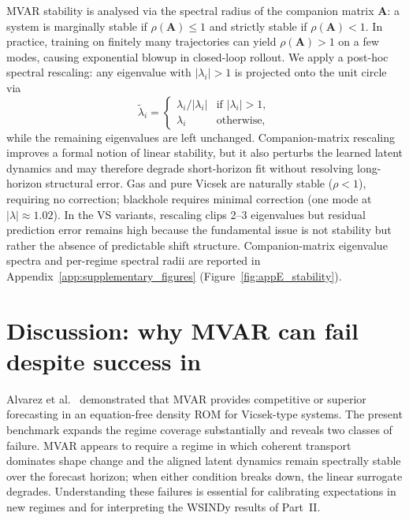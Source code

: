 MVAR stability is analysed via the spectral radius of the companion matrix
$\mathbf{A}$: a system is marginally stable if
$\rho(\mathbf{A})\le 1$ and strictly stable if $\rho(\mathbf{A})<1$.
In practice, training on finitely many trajectories can yield
$\rho(\mathbf{A})>1$ on a few modes, causing exponential blowup in
closed-loop rollout.  We apply a post-hoc spectral rescaling: any eigenvalue with
$|\lambda_i|>1$ is projected onto the unit circle via
\begin{equation}
  \tilde\lambda_i
  = \begin{cases}
      \lambda_i/|\lambda_i| & \text{if } |\lambda_i|>1, \\
      \lambda_i             & \text{otherwise,}
    \end{cases}
  \label{eq:eigenvalue_projection}
\end{equation}
while the remaining eigenvalues are left unchanged.  Companion-matrix
rescaling improves a formal notion of linear stability, but it also
perturbs the learned latent dynamics and may therefore degrade short-horizon
fit without resolving long-horizon structural error.  Gas and pure Vicsek are naturally stable ($\rho<1$),
requiring no correction; blackhole requires minimal correction (one mode
at $|\lambda|\approx 1.02$).  In the VS variants, rescaling clips 2--3
eigenvalues but residual prediction error remains high because the
fundamental issue is not stability but rather the absence of predictable
shift structure.  Companion-matrix eigenvalue spectra and per-regime
spectral radii are reported in
Appendix~\ref{app:supplementary_figures}
(Figure~\ref{fig:appE_stability}).

\section{Discussion: why MVAR can fail despite success in \cite{alvarez2025eqfree}}
\label{sec:ch7_mvar_failure}

Alvarez et al.~\cite{alvarez2025eqfree} demonstrated that MVAR provides
competitive or superior forecasting in an equation-free density ROM for
Vicsek-type systems.  The present benchmark expands the regime coverage
substantially and reveals two classes of failure.  MVAR appears to require a
regime in which coherent transport dominates shape change and the aligned
latent dynamics remain spectrally stable over the forecast horizon; when
either condition breaks down, the linear surrogate degrades.  Understanding
these failures is essential for calibrating expectations in new regimes and
for interpreting the WSINDy results of Part~II.


